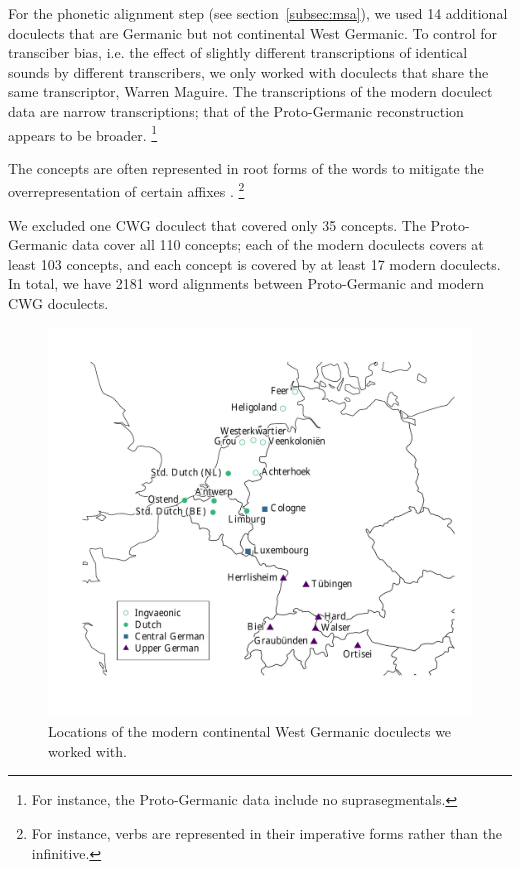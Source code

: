 \documentclass[a4paper]{article}
\begin{document}
For the phonetic alignment step (see section~\ref{subsec:msa}),
we used 14 additional doculects that are Germanic but not continental West Germanic. 
To control for transciber bias,
i.e. the effect of slightly different transcriptions
of identical sounds by different transcribers,
we only worked with doculects that share the same transcriptor,
Warren Maguire.
The transcriptions of the modern doculect data
are narrow transcriptions;
that of the Proto-Germanic reconstruction appears to be broader.
\footnote{
For instance, the Proto-Germanic data include no suprasegmentals.
}

The concepts are often represented in root forms
of the words to mitigate the overrepresentation
of certain affixes \citep{renfrew2009languages}.
\footnote{
For instance, verbs are represented in their imperative forms
rather than the infinitive.
}

We excluded one CWG doculect that covered only 35 concepts. %
The Proto-Germanic data cover all 110 concepts; each of the modern doculects covers at least 103 concepts, and each concept is covered by at least 17 modern doculects.
In total, we have 2181 word alignments between Proto-Germanic and modern CWG doculects.


\begin{figure}[h]
\centering
\includegraphics[width=\textwidth]{figures/map.pdf}
\caption{Locations of the modern continental West Germanic doculects we worked with.}
\label{fig:map}
\end{figure}
\end{document}
